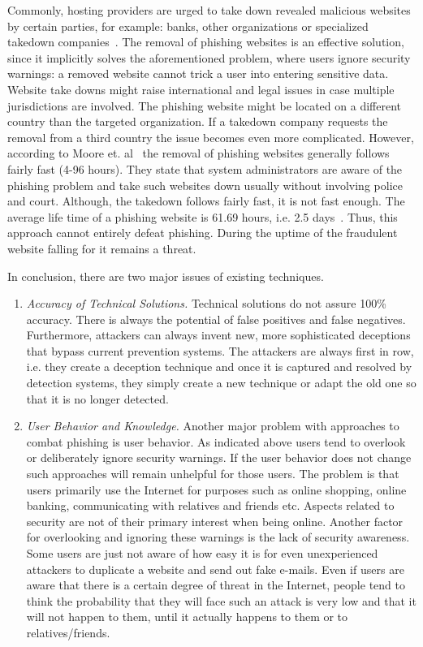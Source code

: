 \begin{description}[leftmargin=0cm]
	\item[Takedown.] Commonly, hosting providers are urged to take down revealed malicious websites by certain parties, for example: banks, other organizations or specialized takedown companies~\cite{moore2007examining}. The removal of phishing websites is an effective solution, since it implicitly solves the aforementioned problem, where users ignore security warnings: a removed website cannot trick a user into entering sensitive data.
Website take downs might raise international and legal issues in case multiple jurisdictions are involved.
The phishing website might be located on a different country than the targeted organization.
If a takedown company requests the removal from a third country the issue becomes even more complicated.
However, according to Moore et. al~\cite{mooretakedown} the removal of phishing websites generally follows fairly fast (4-96 hours).
They state that system administrators are aware of the phishing problem and take such websites down usually without involving police and court.
Although, the takedown follows fairly fast, it is not fast enough.
The average life time of a phishing website is 61.69 hours, i.e. 2.5 days~\cite{moore2007examining}.
Thus, this approach cannot entirely defeat phishing. During the uptime of the fraudulent website falling for it remains a threat.
\end{description}

In conclusion, there are two major issues of existing techniques.
\begin{enumerate}
	\item\textit{Accuracy of Technical Solutions.} Technical solutions do not assure 100\% accuracy.
 There is always the potential of false positives and false negatives.
 Furthermore, attackers can always invent new, more sophisticated deceptions that bypass current prevention systems.
 The attackers are always first in row, i.e. they create a deception technique and once it is captured and resolved by detection systems, they simply create a new technique or adapt the old one so that it is no longer detected.
	\item\textit{User Behavior and Knowledge.} Another major problem with approaches to combat phishing is user behavior.
 As indicated above users tend to overlook or deliberately ignore security warnings.
 If the user behavior does not change such approaches will remain unhelpful for those users.
 The problem is that users primarily use the Internet for purposes such as online shopping, online banking, communicating with relatives and friends etc.
 Aspects related to security are not of their primary interest when being online.
 Another factor for overlooking and ignoring these warnings is the lack of security awareness.
 Some users are just not aware of how easy it is for even unexperienced attackers to duplicate a website and send out fake e-mails.
 Even if users are aware that there is a certain degree of threat in the Internet, people tend to think the probability that they will face such an attack is very low and that it will not happen to them, until it actually happens to them or to relatives/friends.
\end{enumerate}
 

